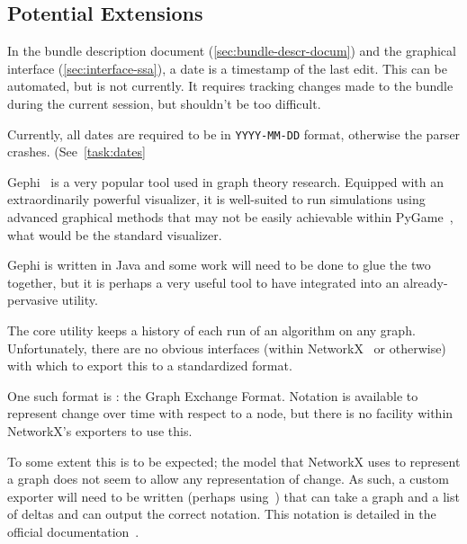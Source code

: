 \subsection{Potential Extensions}
\label{sec:tasks:ext}

\begin{task}
  \label{tast:autodate}
  In the bundle description document (\autoref{sec:bundle-descr-docum})
    and the graphical interface (\autoref{sec:interface-ssa}),
    a date is a timestamp of the last edit.
  This can be automated, but is not currently.
  It requires tracking changes made to the bundle during the current session,
    but shouldn't be too difficult.

  Currently, all dates are required to be in \texttt{YYYY-MM-DD} format,
    otherwise the parser crashes.  (See~\autoref{task:dates}
\end{task}

\begin{task}
  \label{task:gephi-glue}
  Gephi~\autocite{gephi} is a very popular tool used in graph theory research.
  Equipped with an extraordinarily powerful visualizer,
    it is well-suited to run simulations using advanced graphical methods
    that may not be easily achievable within PyGame~\autocite{pygame},
    what would be the standard visualizer.
  
  Gephi is written in Java and some work will need to be done
    to glue the two together, but it is perhaps a very useful tool to have
    integrated into an already-pervasive utility.
\end{task}

\begin{task}
  \label{task:anigexf}
  The core utility keeps a history of each run of an algorithm on any graph.
  Unfortunately, there are no obvious interfaces
    (within NetworkX~\autocite{hagberg:networkx} or otherwise)
    with which to export this to a standardized format.

  One such format is : the Graph Exchange Format.
  Notation is available to represent change over time with respect to a node,
    but there is no facility within NetworkX's exporters to use this.

  To some extent this is to be expected; the model that NetworkX uses to represent a graph
    does not seem to allow any representation of change.
  As such, a custom exporter will need to be written (perhaps using~\autocite{pygexf}) that
    can take a graph and a list of deltas and can output the correct notation.
  This notation is detailed in the official documentation~\autocite{gexf}.
\end{task}

